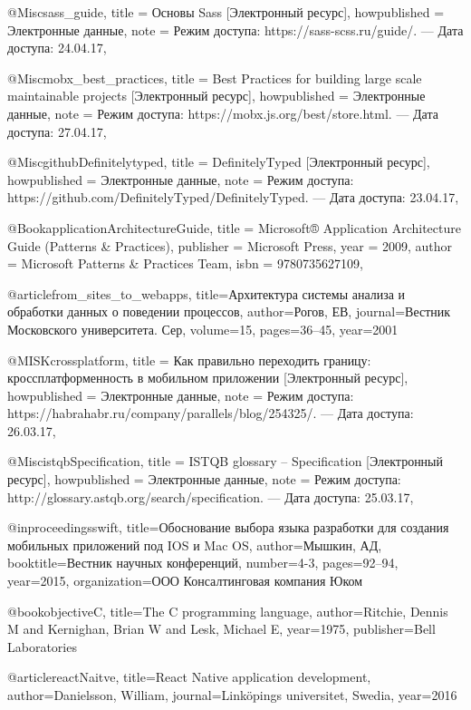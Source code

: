 @Misc{sass_guide,
  title        = {Основы Sass [Электронный ресурс]},
  howpublished = {Электронные данные},
  note         = {Режим доступа: https://sass-scss.ru/guide/. --- Дата доступа: 24.04.17},
}

@Misc{mobx_best_practices,
  title        = {Best Practices for building large scale maintainable projects [Электронный ресурс]},
  howpublished = {Электронные данные},
  note         = {Режим доступа: https://mobx.js.org/best/store.html. --- Дата доступа: 27.04.17},
}


@Misc{githubDefinitelytyped,
  title        = {DefinitelyTyped [Электронный ресурс]},
  howpublished = {Электронные данные},
  note         = {Режим доступа: https://github.com/DefinitelyTyped/DefinitelyTyped. --- Дата доступа: 23.04.17},
}

@Book{applicationArchitectureGuide,
  title     = {Microsoft® Application Architecture Guide (Patterns \& Practices)},
  publisher = {Microsoft Press},
  year      = {2009},
  author    = {Microsoft Patterns \& Practices Team},
  isbn      = {9780735627109},
}

@article{from_sites_to_webapps,
  title={Архитектура системы анализа и обработки данных о поведении процессов},
  author={Рогов, ЕВ},
  journal={Вестник Московского университета. Сер},
  volume={15},
  pages={36--45},
  year={2001}
}

@MISK{crossplatform,
  title        = {Как правильно переходить границу: кроссплатформенность в мобильном приложении [Электронный ресурс]},
  howpublished = {Электронные данные},
  note         = {Режим доступа: https://habrahabr.ru/company/parallels/blog/254325/. --- Дата доступа: 26.03.17},
}

@Misc{istqbSpecification,
  title        = {ISTQB glossary -- Specification [Электронный ресурс]},
  howpublished = {Электронные данные},
  note         = {Режим доступа: http://glossary.astqb.org/search/specification. --- Дата доступа: 25.03.17},
}

@inproceedings{swift,
  title={Обоснование выбора языка разработки для создания мобильных приложений под IOS и Mac OS},
  author={Мышкин, АД},
  booktitle={Вестник научных конференций},
  number={4-3},
  pages={92--94},
  year={2015},
  organization={ООО Консалтинговая компания Юком}
}

@book{objectiveC,
  title={The C programming language},
  author={Ritchie, Dennis M and Kernighan, Brian W and Lesk, Michael E},
  year={1975},
  publisher={Bell Laboratories}
}

@article{reactNaitve,
  title={React Native application development},
  author={Danielsson, William},
  journal={Link{\"o}pings universitet, Swedia},
  year={2016}
}

